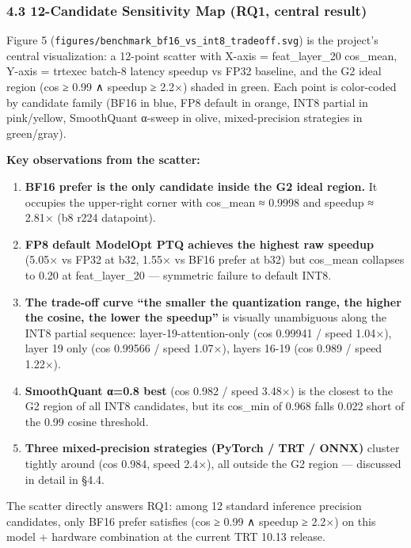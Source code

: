 \documentclass[
]{article}
\providecommand{\tightlist}{%
  \setlength{\itemsep}{0pt}\setlength{\parskip}{0pt}}
\begin{document}
\subsubsection{4.3 12-Candidate Sensitivity Map (RQ1, central
result)}\label{candidate-sensitivity-map-rq1-central-result}

Figure 5 (\texttt{figures/benchmark\_bf16\_vs\_int8\_tradeoff.svg}) is
the project's central visualization: a 12-point scatter with X-axis =
feat\_layer\_20 cos\_mean, Y-axis = trtexec batch-8 latency speedup vs
FP32 baseline, and the G2 ideal region (cos ≥ 0.99 ∧ speedup ≥ 2.2×)
shaded in green. Each point is color-coded by candidate family (BF16 in
blue, FP8 default in orange, INT8 partial in pink/yellow, SmoothQuant
α-sweep in olive, mixed-precision strategies in green/gray).

\textbf{Key observations from the scatter:}

\begin{enumerate}
\def\labelenumi{\arabic{enumi}.}
\tightlist
\item
  \textbf{BF16 prefer is the only candidate inside the G2 ideal region.}
  It occupies the upper-right corner with cos\_mean ≈ 0.9998 and speedup
  ≈ 2.81× (b8 r224 datapoint).
\item
  \textbf{FP8 default ModelOpt PTQ achieves the highest raw speedup}
  (5.05× vs FP32 at b32, 1.55× vs BF16 prefer at b32) but cos\_mean
  collapses to 0.20 at feat\_layer\_20 --- symmetric failure to default
  INT8.
\item
  \textbf{The trade-off curve ``the smaller the quantization range, the
  higher the cosine, the lower the speedup''} is visually unambiguous
  along the INT8 partial sequence: layer-19-attention-only (cos 0.99941
  / speed 1.04×), layer 19 only (cos 0.99566 / speed 1.07×), layers
  16-19 (cos 0.989 / speed 1.22×).
\item
  \textbf{SmoothQuant α=0.8 best} (cos 0.982 / speed 3.48×) is the
  closest to the G2 region of all INT8 candidates, but its cos\_min of
  0.968 falls 0.022 short of the 0.99 cosine threshold.
\item
  \textbf{Three mixed-precision strategies (PyTorch / TRT / ONNX)}
  cluster tightly around (cos 0.984, speed 2.4×), all outside the G2
  region --- discussed in detail in §4.4.
\end{enumerate}

The scatter directly answers RQ1: among 12 standard inference precision
candidates, only BF16 prefer satisfies (cos ≥ 0.99 ∧ speedup ≥ 2.2×) on
this model + hardware combination at the current TRT 10.13 release.
\end{document}
